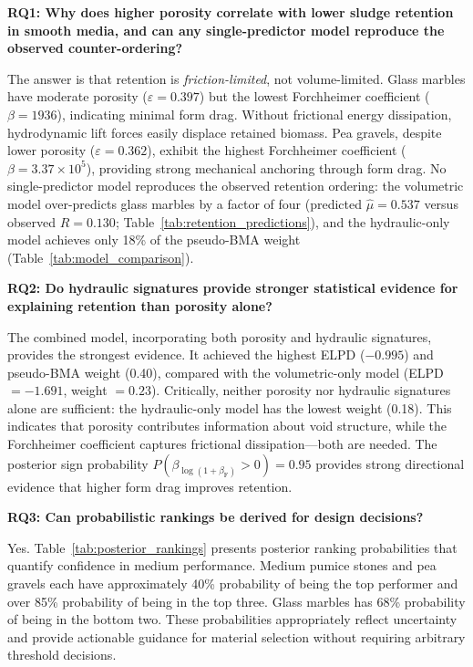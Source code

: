 \documentclass[12pt,a4paper]{article}
\begin{document}
\textbf{RQ1: Why does higher porosity correlate with lower sludge retention in smooth media, and can any single-predictor model reproduce the observed counter-ordering?}

The answer is that retention is \emph{friction-limited}, not volume-limited. Glass marbles have moderate porosity ($\varepsilon = 0.397$) but the lowest Forchheimer coefficient ($\beta = 1936$), indicating minimal form drag. Without frictional energy dissipation, hydrodynamic lift forces easily displace retained biomass. Pea gravels, despite lower porosity ($\varepsilon = 0.362$), exhibit the highest Forchheimer coefficient ($\beta = 3.37 \times 10^5$), providing strong mechanical anchoring through form drag. No single-predictor model reproduces the observed retention ordering: the volumetric model over-predicts glass marbles by a factor of four (predicted $\hat{\mu} = 0.537$ versus observed $R = 0.130$; Table~\ref{tab:retention_predictions}), and the hydraulic-only model achieves only 18\% of the pseudo-BMA weight (Table~\ref{tab:model_comparison}).

\textbf{RQ2: Do hydraulic signatures provide stronger statistical evidence for explaining retention than porosity alone?}

The combined model, incorporating both porosity and hydraulic signatures, provides the strongest evidence. It achieved the highest ELPD ($-0.995$) and pseudo-BMA weight (0.40), compared with the volumetric-only model (ELPD $= -1.691$, weight $= 0.23$). Critically, neither porosity nor hydraulic signatures alone are sufficient: the hydraulic-only model has the lowest weight (0.18). This indicates that porosity contributes information about void structure, while the Forchheimer coefficient captures frictional dissipation---both are needed. The posterior sign probability $P(\beta_{\log(1+\beta_{\mathrm{F}})} > 0) = 0.95$ provides strong directional evidence that higher form drag improves retention.

\textbf{RQ3: Can probabilistic rankings be derived for design decisions?}

Yes. Table~\ref{tab:posterior_rankings} presents posterior ranking probabilities that quantify confidence in medium performance. Medium pumice stones and pea gravels each have approximately 40\% probability of being the top performer and over 85\% probability of being in the top three. Glass marbles has 68\% probability of being in the bottom two. These probabilities appropriately reflect uncertainty and provide actionable guidance for material selection without requiring arbitrary threshold decisions.
\end{document}
